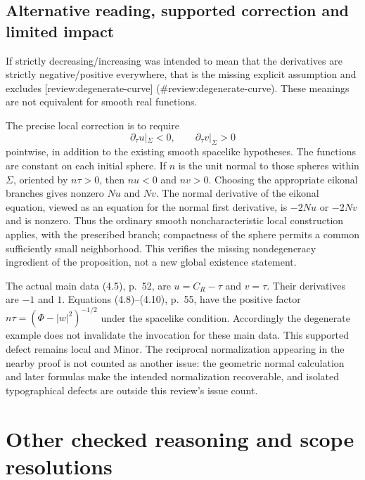 \documentclass[10pt]{article}
\begin{document}
\subsection*{Alternative reading, supported correction and limited impact}
If strictly decreasing/increasing was intended to mean that the derivatives are strictly negative/positive everywhere, that is the missing explicit assumption and excludes [review:degenerate-curve] (\#review:degenerate-curve). These meanings are not equivalent for smooth real functions.\par
The precise local correction is to require \[\partial_\tau u|_\Sigma<0,\qquad
 \partial_\tau v|_\Sigma>0\] pointwise, in addition to the existing smooth spacelike hypotheses. The functions are constant on each initial sphere. If \(n\) is the unit normal to those spheres within \(\Sigma\), oriented by \(n\tau>0\), then \(nu<0\) and \(nv>0\). Choosing the appropriate eikonal branches gives nonzero \(Nu\) and \(Nv\). The normal derivative of the eikonal equation, viewed as an equation for the normal first derivative, is \(-2Nu\) or \(-2Nv\) and is nonzero. Thus the ordinary smooth noncharacteristic local construction applies, with the prescribed branch; compactness of the sphere permits a common sufficiently small neighborhood. This verifies the missing nondegeneracy ingredient of the proposition, not a new global existence statement.\par
The actual main data (4.5), p. 52, are \(u=C_R-\tau\) and \(v=\tau\). Their derivatives are \(-1\) and \(1\). Equations (4.8)–(4.10), p. 55, have the positive factor \(n\tau=(\Phi-|w|^2)^{-1/2}\) under the spacelike condition. Accordingly the degenerate example does not invalidate the invocation for these main data. This supported defect remains local and Minor. The reciprocal normalization appearing in the nearby proof is not counted as another issue: the geometric normal calculation and later formulas make the intended normalization recoverable, and isolated typographical defects are outside this review’s issue count.\par
\section*{Other checked reasoning and scope resolutions}
\end{document}
